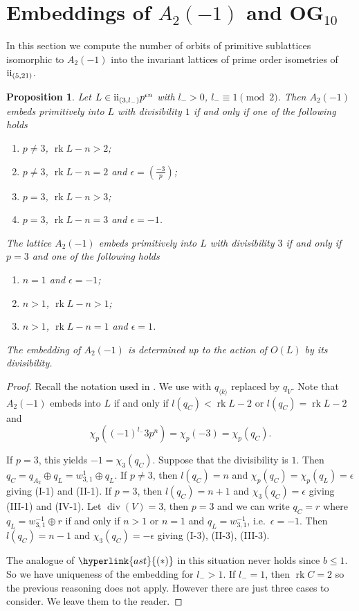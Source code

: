 \documentclass{amsart}
\theoremstyle{definition}
\theoremstyle{plain}
\newtheorem{proposition}[definition]{Proposition}
\DeclareMathOperator{\rk}{rk}
\newcommand{\RN}[1]{\textup{\uppercase\expandafter{\romannumeral#1}}}
\newcommand{\even}{\RN{2}}
\newcommand{\leg}[2]{\left( \frac{#1}{#2}\right)}
\renewcommand{\div}{\mathop{div}}
\newcommand{\condAst}{\hyperlink{ast}{(\ast)}}
\begin{document}
\section{Embeddings of \texorpdfstring{$A_2(-1)$}{A2(-1)} and \texorpdfstring{OG$_{10}$}{OG10}}\label{sec: OG10}
In this section we compute the number of orbits of primitive sublattices isomorphic to $A_2(-1)$ into the invariant lattices of prime order isometries of $\even_{(5,21)}$.

\begin{proposition}
 Let $L \in \even_{(3,l_-)}p^{\epsilon n}$ with $l_- > 0$, $l_- \equiv 1 \pmod 2$.
 Then $A_2(-1)$ embeds primitively into $L$ with divisibility $1$ if and only if one of the following holds
 \begin{enumerate}
  \item[(I-1)] $p\neq 3$, $\rk L - n > 2$;
  \item[(II-1)] $p\neq 3$, $\rk L - n = 2$ and $\epsilon = \leg{-3}{p}$;
  \item[(III-1)] $p =   3$, $\rk L - n > 3$;
  \item[(IV-1)] $p =   3$, $\rk L - n = 3$ and $\epsilon = -1$.
 \end{enumerate}
The lattice $A_2(-1)$ embeds primitively into $L$ with divisibility $3$ if and only if $p=3$ and one of the following holds
 \begin{enumerate}
  \item[(I-3)] $n=1$ and $\epsilon=-1$;
  \item[(II-3)] $n>1$, $\rk L - n > 1$;
  \item[(III-3)] $n>1$, $\rk L - n = 1$ and $\epsilon = 1$.
 \end{enumerate}
 The embedding of $A_2(-1)$ is determined up to the action of $O(L)$ by its divisibility.
\end{proposition}
\begin{proof}
 Recall the notation used in . We use  with $q_{\langle k \rangle}$ replaced by $q_V$.
 Note that $A_2(-1)$ embeds into $L$ if and only if
 $l(q_C)< \rk L -2$ or $l(q_C)=\rk L-2$ and
 \[\chi_p((-1)^{l_-} 3 p^n) =\chi_p(-3)= \chi_p(q_C).\]
 
 If $p = 3$, this yields $-1=\chi_3(q_C)$.
  Suppose that the divisibility is $1$. Then
  $q_C=q_{A_2} \oplus q_L=w_{3,1}^1 \oplus q_L$.
 If $p \neq 3$, then $l(q_C)=n$ and $\chi_p(q_C)=\chi_p(q_L)=\epsilon$ giving (I-1) and (II-1).
 If $p = 3$, then $l(q_C)=n+1$ and $\chi_3(q_C)=\epsilon$ giving (III-1) and (IV-1).
 Let $\div(V)=3$, then $p=3$ and we can write $q_C= r$ where $q_L = w_{3,1}^{-1} \oplus r$ if and only if $n>1$ or $n=1$ and $q_L=w_{3,1}^{-1}$, i.e.\ $\epsilon=-1$.
 Then $l(q_C)=n -1$ and $\chi_3(q_C)=-\epsilon$ giving (I-3), (II-3), (III-3).

 The analogue of $\condAst$ in this situation never holds since $b \leq 1$. So we have uniqueness of the embedding for $l_- >1$. If $l_-=1$, then $\rk C=2$ so the previous reasoning does not apply. However there are just three cases to consider. We leave them to the reader.
\end{proof}
\end{document}
